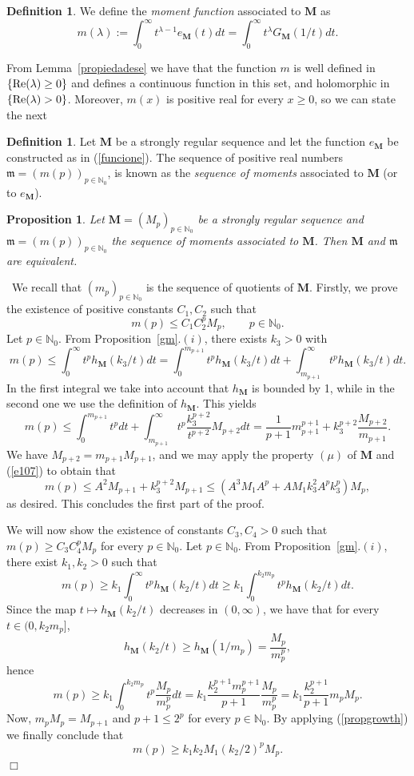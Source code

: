 \documentclass[11pt,a4paper,leqno]{article}
\theoremstyle{plain}
\newtheorem{prop}[theo]{Proposition}
\theoremstyle{definition}
\newtheorem{defin}[theo]{Definition}
\newenvironment{proof1}{\medskip\par\noindent{\bf Proof}}{\hfill $\Box$
\medskip\par}
\def\N{\mathbb{N}}
\def\bM{\boldsymbol{M}}
\begin{document}
\begin{defin}
We define the \textit{moment function} associated to $\bM$ as
$$m(\lambda):=\int_{0}^{\infty}t^{\lambda-1}e_{\bM}(t)dt=\int_{0}^{\infty}t^{\lambda}G_{\bM}(1/t)dt.$$
\end{defin}

From Lemma~\ref{propiedadese} we have that the function $m$ is well defined in $\{\hbox{Re}(\lambda)\ge0\}$ and defines a continuous function in this set, and holomorphic in $\{\hbox{Re}(\lambda)>0\}$. Moreover, $m(x)$ is positive real for every $x\ge0$, so we can state the next
\begin{defin}
Let $\bM$ be a strongly regular sequence and let the function $e_{\bM}$ be constructed as in (\ref{funcione}). The sequence of positive real numbers $\mathfrak{m}=(m(p))_{p\in\N_0}$, is known as the \textit{sequence of moments} associated to $\bM$ (or to $e_{\bM}$).
\end{defin}
\begin{prop}\label{mequivm}
Let $\bM=(M_p)_{p\in\N_0}$ be a strongly regular sequence and $\mathfrak{m}=(m(p))_{p\in\N_0}$ the sequence of moments associated to $\bM$. Then $\bM$ and $\mathfrak{m}$ are equivalent.
\end{prop}
\begin{proof1}
\ We recall that $(m_p)_{p\in\N_0}$ is the sequence of quotients of $\bM$.
Firstly, we prove the existence of positive constants $C_1,C_2$ such that
\begin{equation}\label{porarriba}
m(p)\le C_1 C_2^pM_p,\qquad p\in\N_0.
\end{equation}
Let $p\in\N_0$. From Proposition~\ref{gm}$.(i)$, there exists $k_3>0$ with
$$m(p)\le\int_{0}^{\infty}t^{p}h_{\bM}(k_3/t)dt=
\int_{0}^{m_{p+1}}t^{p}h_{\bM}(k_3/t)dt+
\int_{m_{p+1}}^{\infty}t^{p}h_{\bM}(k_3/t)dt.$$
In the first integral we take into account that $h_{\bM}$ is bounded by 1, while in the second one we use the definition of $h_{\bM}$.
This yields
$$m(p)\le\int_{0}^{m_{p+1}}t^{p}dt+ \int_{m_{p+1}}^{\infty}t^{p}\frac{k_3^{p+2}}{t^{p+2}}M_{p+2}dt=
\frac{1}{p+1}m_{p+1}^{p+1}+k_3^{p+2}\frac{M_{p+2}}{m_{p+1}}.$$
We have $M_{p+2}=m_{p+1}M_{p+1}$, and we may apply the property $(\mu)$ of $\bM$ and (\ref{e107}) to obtain that
$$
m(p)\le A^2M_{p+1}+k_3^{p+2}M_{p+1}\le (A^3M_1A^p+AM_1k_3^2A^pk_3^p)M_p,
$$
as desired. This concludes the first part of the proof.\par
We will now show the existence of constants $C_3,C_4>0$ such that $m(p)\ge C_3 C_4^pM_p$ for every $p\in\N_0$. Let $p\in\N_0$. From Proposition~\ref{gm}$.(i)$, there exist $k_1,k_2>0$ such that
$$
m(p)\ge k_1\int_{0}^{\infty}t^{p}h_{\bM}(k_2/t)dt\ge k_1 \int_{0}^{k_2m_p}t^{p}h_{\bM}(k_2/t)dt.
$$
Since the map $t\mapsto h_{\bM}(k_2/t)$ decreases in $(0,\infty)$, we have that for every $t\in(0,k_2m_p]$,
$$
h_{\bM}(k_2/t)\ge h_{\bM}(1/m_p)=\frac{M_p}{m_p^p},
$$
hence
$$
m(p)\ge k_1\int_{0}^{k_2m_p}t^{p}\frac{M_p}{m_p^p}dt= k_1\frac{k_2^{p+1}m_p^{p+1}}{p+1}\frac{M_p}{m_p^p}=
k_1\frac{k_2^{p+1}}{p+1}m_pM_p.
$$
Now, $m_pM_p=M_{p+1}$ and $p+1\le 2^p$ for every $p\in\N_0$. By applying (\ref{propgrowth}) we finally conclude that
$$
m(p)\ge k_1k_2M_1(k_2/2)^pM_p.
$$
\end{proof1}
\end{document}
